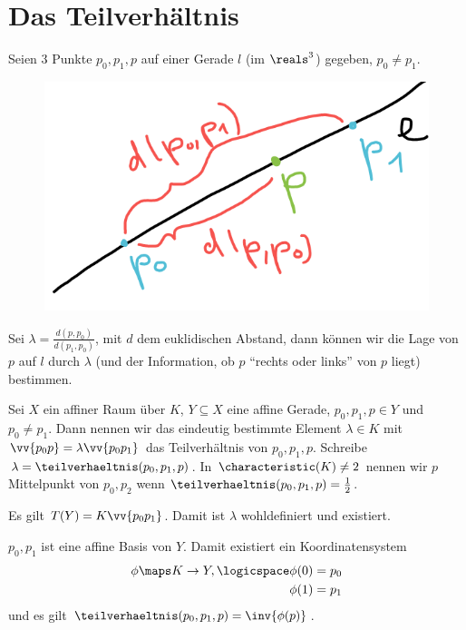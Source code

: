 \section{Das Teilverhältnis}
\begin{idee*}
    Seien 3 Punkte \( p_0,p_1,p \) auf einer Gerade \( l \) (\zb im \( \reals^3 \)) gegeben, \( p_0\neq p_1 \).
    \begin{figure}[H]
        \centering
        \includegraphics[width=0.5\linewidth]{figures/gerade_teilverhaeltnis}
        \caption*{}
        \label{fig:gerade_teilverhaeltnis}
    \end{figure}
    Sei \( \lambda=\frac{d(p,p_0)}{d(p_1,p_0)} \), mit \( d \) dem euklidischen Abstand, dann können wir die Lage von \( p \) auf \( l \) durch \( \lambda \) (und der Information, ob \( p \) \enquote{rechts oder links} von \( p \) liegt) bestimmen.
\end{idee*}
\begin{definition*}
    Sei \( X \) ein affiner Raum über \( K \), \( Y\subseteq X \) eine affine Gerade, \( p_0,p_1,p\in Y \) und \( p_0\neq p_1 \). Dann nennen wir das eindeutig bestimmte Element \( \lambda\in K \) mit \( \vv{p_0 p}=\lambda \vv{p_0 p_1} \) das Teilverhältnis von \( p_0,p_1,p \). Schreibe \( \lambda=\teilverhaeltnis(p_0,p_1,p) \). In \( \characteristic(K)\neq 2 \) nennen wir \( p \) Mittelpunkt von \( p_0,p_2 \) wenn \( \teilverhaeltnis(p_0,p_1,p)=\frac{1}{2} \).
\end{definition*}
\begin{bemerkungen*}
    \begin{eigenschaftenenumerate}
        \item Es gilt \( T(Y)=K\vv{p_0p_1} \). Damit ist \( \lambda \) wohldefiniert und existiert.
        \item \( p_0,p_1 \) ist eine affine Basis von \( Y \). Damit existiert ein Koordinatensystem
        \begin{align*}
            \phi\maps K\to Y,\logicspace \begin{aligned}[t]
                \phi(0)&=p_0\\
                \phi(1)&=p_1
            \end{aligned}
        \end{align*}
        und es gilt \( \teilverhaeltnis(p_0,p_1,p)=\inv{\phi(p)} \).
    \end{eigenschaftenenumerate}
    
\end{bemerkungen*}
